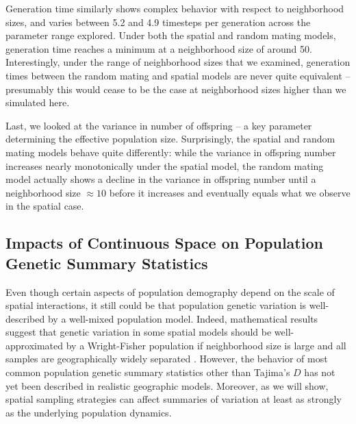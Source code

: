 \documentclass[10pt,twoside,lineno,hidelinks]{preprint}
\begin{document}
Generation time similarly shows complex behavior with respect to neighborhood sizes, and varies between 5.2 and 4.9 timesteps per generation across the parameter range explored. 
Under both the spatial and random mating models, 
generation time reaches a minimum at a neighborhood size of around 50. 
Interestingly, under the range of neighborhood sizes that we examined, generation times between the random mating and spatial models are never quite equivalent -- presumably this would cease to be the case at neighborhood sizes higher than we simulated here.

Last, we looked at the variance in number of offspring -- a key parameter determining the effective population size. 
Surprisingly, the spatial and random mating models behave quite differently: 
while the variance in offspring number increases nearly monotonically under the spatial model, the random mating model actually shows a decline in the variance in offspring number until a neighborhood size $\approx 10$ before it increases and eventually equals what we observe in the spatial case. 



\subsection{Impacts of Continuous Space on Population Genetic Summary Statistics}

Even though certain aspects of population demography depend on the scale of spatial interactions, it still could be that population genetic variation is well-described by a well-mixed population model. Indeed, mathematical results suggest that genetic variation in some spatial models should be well-approximated by a Wright-Fisher population if neighborhood size is large and all samples are geographically widely separated \citep{wilkins2004separation,zahle2005stepping}. However, the behavior of most common population genetic summary statistics other than Tajima's $D$ \citep{Stadler2009} has not yet been described in realistic geographic models. Moreover, as we will show, spatial sampling strategies can affect summaries of variation at least as strongly as the underlying population dynamics. 
\end{document}
